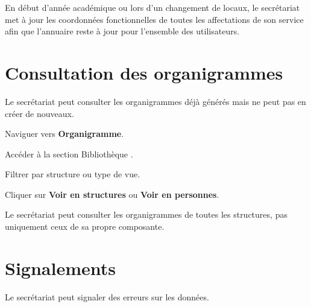 
\begin{tipbox}
  En d\'ebut d'ann\'ee acad\'emique ou lors d'un changement de locaux, le secr\'etariat met \`a jour les coordonn\'ees fonctionnelles de toutes les affectations de son service afin que l'annuaire reste \`a jour pour l'ensemble des utilisateurs.
\end{tipbox}

\section{Consultation des organigrammes}

Le secr\'etariat peut consulter les organigrammes d\'ej\`a g\'en\'er\'es mais ne peut pas en cr\'eer de nouveaux.

\begin{steps}
  \item Naviguer vers \textbf{Organigramme}.
  \item Acc\'eder \`a la section \og Biblioth\`eque \fg{}.
  \item Filtrer par structure ou type de vue.
  \item Cliquer sur \textbf{Voir en structures} ou \textbf{Voir en personnes}.
\end{steps}


\begin{notebox}
  Le secr\'etariat peut consulter les organigrammes de toutes les structures, pas uniquement ceux de sa propre composante.
\end{notebox}

\section{Signalements}

Le secr\'etariat peut signaler des erreurs sur les donn\'ees.

